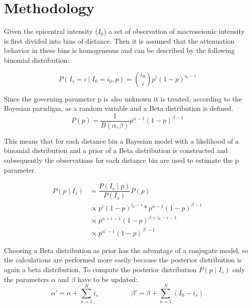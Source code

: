 
\chapter{Methodology} %

\label{Chapter2} %



Given the epicentral intensity ($I_0$) a set of observation of macroseismic intensity is  first divided into bins  of distance. Then it is assumed that the attenuation behavior in these bins is homogeneous and can be described by the following binomial distribution:


\begin{equation}
P(I_s = i\mid I_0 = i_0, p) = \binom{i_0}{i} p^i(1-p)^{i_0-i}
\label{eqn:likelihood1}
\end{equation}


Since the governing parameter p is also unknown it is treated, according to the Bayesian paradigm, as a random variable and a Beta distribution is defined.
\begin{equation}
P(p) = \dfrac{1}{B(\alpha,\beta)} p^{\alpha-1} (1-p)^{\beta -1} 
\label{eqn:prior}
\end{equation}

This means that for each distance bin a Bayesian model with a likelihood of a binomial distribution and a prior of a Beta distribution is constructed and subsequently the observations for each distance bin are used to estimate the p parameter.

\begin{subequations}
\begin{align}
P(p \mid I_s) & = \dfrac{P(I_s \mid p)}{P(I_s)} P(p) \\
 & \propto p^i(1-p)^{i_0-i} * p^{\alpha-1} (1-p)^{\beta -1}\\
 & \propto p^{\alpha + i -1}(1-p)^{\beta +i_0-i -1}\\
 & \propto p^{\alpha' -1}(1-p)^{\beta' -1}
\end{align}
\label{eqn:posterior}
\end{subequations}

Choosing a Beta distribution as prior has the advantage of a conjugate model, so the calculations are performed more easily because the posterior distribution is again a beta distribution. To compute the posterior distribution $P(p \mid I_s)$ only the parameters $\alpha$  and $\beta$ have to be updated:
\begin{equation}
\alpha' = \alpha + \sum^N_{n= 1} i_s \hspace{2cm} \beta' =  \beta + \sum^N_{n= 1} (I_0 - i_s)
\label{eqn:updatehyper}
\end{equation}

